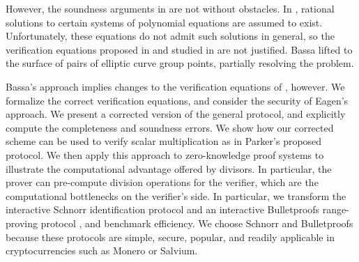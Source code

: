 \documentclass[11pt,letterpaper]{article}
\theoremstyle{definition}
\newcommand{\6}{\mathbf}
\newcommand{\7}{\mathcal}
\begin{document}
However, the soundness arguments in \cite{SoundnessForDLP} are not without  obstacles. In \cite{Eagen}, rational solutions to certain systems of polynomial equations are assumed to exist.
Unfortunately, these equations do not admit such solutions in general, so the verification equations proposed in \cite{Eagen} and studied in \cite{SoundnessForDLP} are not justified. Bassa lifted to the surface of pairs of elliptic curve group points, partially resolving the problem. 

Bassa's approach implies changes to the verification equations  of \cite{Eagen}, however. We formalize the correct verification equations, and consider the security of Eagen's approach. We present a corrected version of the general protocol, and explicitly compute the completeness and soundness errors.
We show how our corrected scheme can be used to verify scalar multiplication as in Parker's proposed protocol.
We then apply this approach to zero-knowledge proof systems to illustrate the computational advantage offered by divisors. 
In particular, the prover can pre-compute division operations for the verifier, which are the computational bottlenecks on the verifier's side.
In particular, we transform the interactive Schnorr identification protocol \cite{Schnorr} and an interactive Bulletproofs range-proving protocol \cite{Bullet}, and benchmark efficiency.
We choose Schnorr and Bulletproofs because these protocols are simple, secure, popular, and readily applicable in cryptocurrencies such as Monero or Salvium.  


\end{document}
